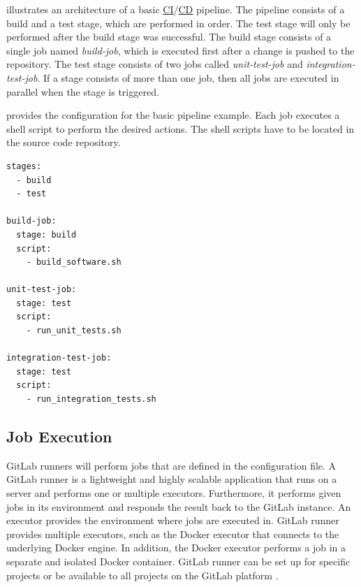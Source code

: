  illustrates an architecture of a basic \hyperlink{abbr:ci}{CI}/\hyperlink{abbr:cd}{CD} pipeline.
The pipeline consists of a build and a test stage, which are performed in order. The test stage will only be performed after the build stage was successful.
The build stage consists of a single job named \textit{build-job}, which is executed first after a change is pushed to the repository.
The test stage consists of two jobs called \textit{unit-test-job} and \textit{integration-test-job}. If a stage consists of more than one job, then all jobs are executed in parallel when the stage is triggered.



 provides the configuration for the basic pipeline example.
Each job executes a shell script to perform the desired actions. The shell scripts have to be located in the source code repository.
\begin{lstlisting}[label=lst:04_gitlab_pipeline_basic_config-example, caption=Example of a \texttt{.gitlab-ci.yml} configuration file]
stages:
  - build
  - test

build-job:
  stage: build
  script:
    - build_software.sh

unit-test-job:
  stage: test
  script:
    - run_unit_tests.sh
    
integration-test-job:
  stage: test
  script:
    - run_integration_tests.sh
\end{lstlisting}


\subsection{Job Execution}
\label{sec:04_background_gitlab_job}
GitLab runners will perform jobs that are defined in the configuration file. 
A GitLab runner is a lightweight and highly scalable application that runs on a server and performs one or multiple executors. Furthermore, it performs given jobs in its environment and responds the result back to the GitLab instance.
An executor provides the environment where jobs are executed in. GitLab runner provides multiple executors, such as the Docker executor that connects to the underlying Docker engine. In addition, the Docker executor performs a job in a separate and isolated Docker container.
GitLab runner can be set up for specific projects or be available to all projects on the GitLab platform \cite{Gitlab2020Docs}.


